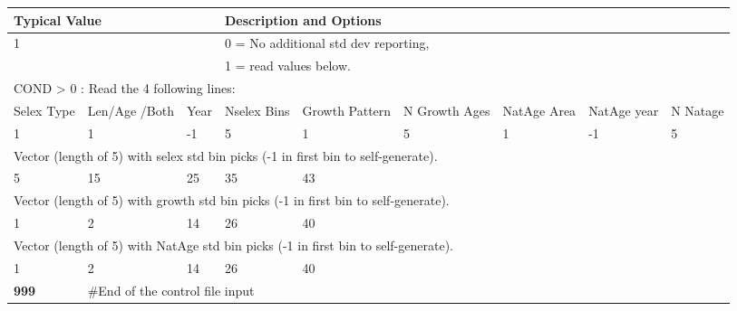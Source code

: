 \begin{longtable}{p{1.1cm} p{1.4cm} p{1.2cm} p{1.2cm} p{1.3cm} p{1.6cm} p{1.4cm} p{1.4cm} p{1.4cm}}

	\hline
	\multicolumn{3}{l}{Typical Value} & \multicolumn{6}{l}{Description and Options}\Tstrut\Bstrut\\
	\hline
	\endfirsthead


	\multicolumn{3}{l}{1} & \multicolumn{6}{l}{0 = No additional std dev reporting,} \Tstrut\\
	\multicolumn{3}{l}{ } & \multicolumn{6}{l}{1 = read values below.}\Bstrut\\

	\multicolumn{9}{l}{COND > 0 : Read the 4 following lines:}\Bstrut\\
	
	\hline
	\Tstrut Selex Type & Len/Age /Both & Year & Nselex Bins & Growth Pattern & N Growth Ages & NatAge Area & NatAge year  & N Natage\Bstrut\\
	\hline
	1 & 1 & -1 & 5 & 1 & 5 & 1 & -1 & 5\Tstrut\Bstrut\\ 
	
	\hline
	\multicolumn{9}{l}{Vector (length of 5) with selex std bin picks (-1 in first bin to self-generate).} \Tstrut\Bstrut\\
	\hline
	5 & 15 & 25 & 35 & 43 & & & & \Tstrut\Bstrut\\
	
	\hline
	\multicolumn{9}{l}{Vector (length of 5) with growth std bin picks (-1 in first bin to self-generate).} \Tstrut\Bstrut\\
	\hline	
	1 & 2 & 14 & 26 & 40 & & & & \Tstrut\Bstrut\\	
	
	\hline
	\multicolumn{9}{l}{Vector (length of 5) with NatAge std bin picks (-1 in first bin to self-generate).} \Tstrut\Bstrut\\
	\hline	
	1 & 2 & 14 & 26 & 40 & & & & \Tstrut\Bstrut\\
	
	\hline
	\bfseries{999} & \multicolumn{8}{l}{\#End of the control file input}\Tstrut\Bstrut\\
	\hline			
\end{longtable}



